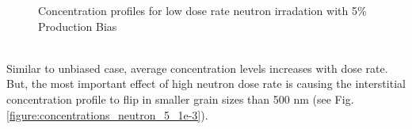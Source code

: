 \documentclass[a4paper]{article}
\begin{document}
\begin{figure}[h!]
      \caption{Concentration profiles for low dose rate neutron irradation with 5\% Production Bias}
      \label{figure:concentrations_neutron_5_1e-6}
    \end{figure}\\

    Similar to unbiased case, average concentration levels increases with dose rate. But, the most important effect of high neutron dose rate is causing the interstitial concentration profile to flip in smaller grain sizes than 500 nm (see Fig. \ref{figure:concentrations_neutron_5_1e-3}).\\
    \begin{figure}[htb!]  %
      \centering
      \qquad

\end{figure}
\end{document}
